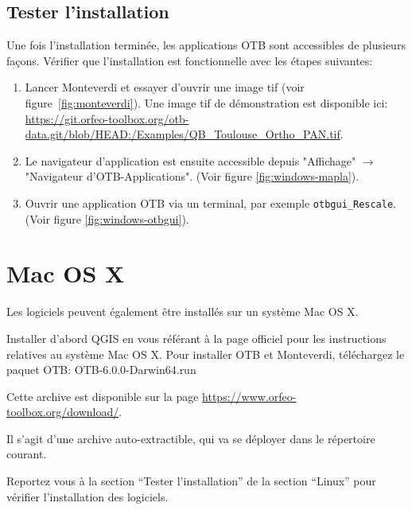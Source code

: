 \documentclass[10pt,a4paper]{article}
\begin{document}
\subsection{Tester l'installation}
Une fois l'installation terminée, les applications OTB sont accessibles de
plusieurs façons. Vérifier que l'installation est fonctionnelle avec les étapes
suivantes:
\begin{enumerate}

\item Lancer Monteverdi et essayer d'ouvrir une image tif (voir
figure~\ref{fig:monteverdi}). Une image tif de démonstration est disponible ici:
\url{https://git.orfeo-toolbox.org/otb-data.git/blob/HEAD:/Examples/QB\_Toulouse\_Ortho\_PAN.tif}.

\item Le navigateur d'application est ensuite accessible depuis "Affichage"
$\rightarrow$ "Navigateur d'OTB-Applications".
(Voir figure \ref{fig:windows-mapla}).

\item Ouvrir une application OTB via un terminal, par exemple
\texttt{otbgui\_Rescale}. (Voir figure \ref{fig:windows-otbgui}).

\end{enumerate}

\clearpage
\section{Mac OS X}

Les logiciels peuvent également être installés sur un système Mac OS X.

Installer d'abord QGIS en vous référant à la page officiel pour les instructions
relatives au système Mac OS X.
Pour installer OTB et Monteverdi, téléchargez le paquet OTB:
OTB-6.0.0-Darwin64.run

Cette archive est disponible sur la page \url{https://www.orfeo-toolbox.org/download/}.

Il s'agit d'une archive auto-extractible, qui va se déployer dans le répertoire
courant.

Reportez vous à la section ``Tester l'installation'' de la section ``Linux''
pour vérifier l'installation des logiciels.
\end{document}
